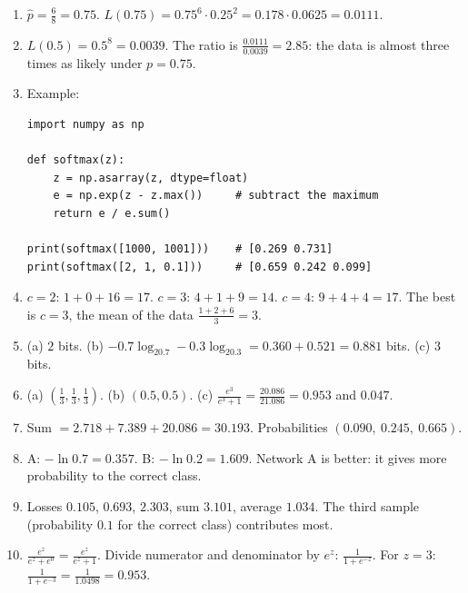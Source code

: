 \begin{enumerate}[label=\textbf{\ansnum.\arabic*}]
  \item $\hat p=\frac68=0.75$. $L(0.75)=0.75^6\cdot0.25^2=0.178\cdot0.0625=0.0111$.
  \item $L(0.5)=0.5^8=0.0039$. The ratio is $\frac{0.0111}{0.0039}=2.85$: the data is almost three times as likely under $p=0.75$.
  \item Example:
\begin{verbatim}
import numpy as np

def softmax(z):
    z = np.asarray(z, dtype=float)
    e = np.exp(z - z.max())     # subtract the maximum
    return e / e.sum()

print(softmax([1000, 1001]))    # [0.269 0.731]
print(softmax([2, 1, 0.1]))     # [0.659 0.242 0.099]
\end{verbatim}
  \item $c=2$: $1+0+16=17$. $c=3$: $4+1+9=14$. $c=4$: $9+4+4=17$. The best is $c=3$, the mean of the data $\frac{1+2+6}{3}=3$.
  \item (a) $2$ bits. (b) $-0.7\log_20.7-0.3\log_20.3=0.360+0.521=0.881$ bits. (c) $3$ bits.
  \item (a) $(\frac13,\frac13,\frac13)$. (b) $(0.5,0.5)$. (c) $\frac{e^3}{e^3+1}=\frac{20.086}{21.086}=0.953$ and $0.047$.
  \item Sum $=2.718+7.389+20.086=30.193$. Probabilities $(0.090,\ 0.245,\ 0.665)$.
  \item A: $-\ln0.7=0.357$. B: $-\ln0.2=1.609$. Network A is better: it gives more probability to the correct class.
  \item Losses $0.105$, $0.693$, $2.303$, sum $3.101$, average $1.034$. The third sample (probability $0.1$ for the correct class) contributes most.
  \item[\textbf{\ansnum.10}] $\frac{e^z}{e^z+e^0}=\frac{e^z}{e^z+1}$. Divide numerator and denominator by $e^z$: $\frac{1}{1+e^{-z}}$. For $z=3$: $\frac{1}{1+e^{-3}}=\frac1{1.0498}=0.953$.
\end{enumerate}
